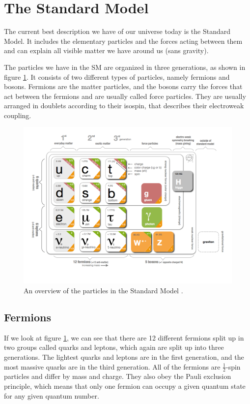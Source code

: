\section{The Standard Model}
\label{sec:SM}
The current best description we have of our universe today is the Standard Model. It includes the elementary particles and the forces acting between them and can explain all visible matter we have around us (sans gravity). 

The particles we have in the SM are organized in three generations, as shown in figure \ref{fig:SM}. It consists of two different types of particles, namely fermions and bosons. Fermions are the matter particles, and the bosons carry the forces that act between the fermions and are usually called force particles. They are usually arranged in doublets according to their isospin, that describes their electroweak coupling. 

\begin{figure}[H]
    \centering
    \includegraphics[width=\textwidth]{Figures/FromOnline/SM.png}
    \caption{An overview of the particles in the Standard Model \cite{SMpicture}.}
    \label{fig:SM}
\end{figure}

\subsection{Fermions}
If we look at figure \ref{fig:SM}, we can see that there are 12 different fermions split up in two groups called quarks and leptons, which again are split up into three generations. The lightest quarks and leptons are in the first generation, and the most massive quarks are in the third generation. All of the fermions are $\frac{1}{2}$-spin particles and differ by mass and charge. They also obey the Pauli exclusion principle, which means that only one fermion can occupy a given quantum state for any given quantum number.

